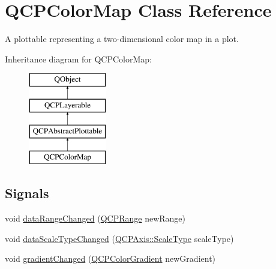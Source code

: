 \hypertarget{class_q_c_p_color_map}{}\section{Q\+C\+P\+Color\+Map Class Reference}
\label{class_q_c_p_color_map}


A plottable representing a two-\/dimensional color map in a plot.  


Inheritance diagram for Q\+C\+P\+Color\+Map\+:\begin{figure}[H]
\begin{center}
\leavevmode
\includegraphics[height=4.000000cm]{class_q_c_p_color_map}
\end{center}
\end{figure}
\subsection*{Signals}
\begin{DoxyCompactItemize}
\item 
void \mbox{\hyperlink{class_q_c_p_color_map_a482980f2335d09cfb36dd95ba9663197}{data\+Range\+Changed}} (\mbox{\hyperlink{class_q_c_p_range}{Q\+C\+P\+Range}} new\+Range)
\item 
void \mbox{\hyperlink{class_q_c_p_color_map_a978d5d5c9f68cffef8c902b855c04490}{data\+Scale\+Type\+Changed}} (\mbox{\hyperlink{class_q_c_p_axis_a36d8e8658dbaa179bf2aeb973db2d6f0}{Q\+C\+P\+Axis\+::\+Scale\+Type}} scale\+Type)
\item 
void \mbox{\hyperlink{class_q_c_p_color_map_abf4797f86e422ac6e0f732c4ff1a4d49}{gradient\+Changed}} (\mbox{\hyperlink{class_q_c_p_color_gradient}{Q\+C\+P\+Color\+Gradient}} new\+Gradient)
\end{DoxyCompactItemize}
